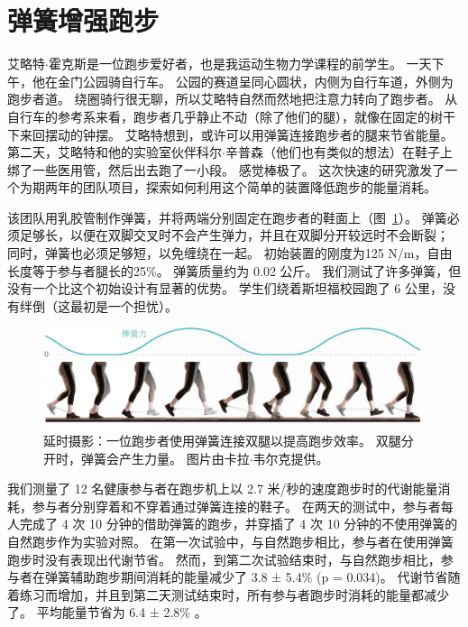\section{弹簧增强跑步}

艾略特$\cdot$霍克斯是一位跑步爱好者，也是我运动生物力学课程的前学生。
一天下午，他在金门公园骑自行车。
公园的赛道呈同心圆状，内侧为自行车道，外侧为跑步者道。
绕圈骑行很无聊，所以艾略特自然而然地把注意力转向了跑步者。
从自行车的参考系来看，跑步者几乎静止不动（除了他们的腿），就像在固定的树干下来回摆动的钟摆。
艾略特想到，或许可以用弹簧连接跑步者的腿来节省能量。
第二天，艾略特和他的实验室伙伴科尔$\cdot$辛普森（他们也有类似的想法）在鞋子上绑了一些医用管，然后出去跑了一小段。
感觉棒极了。
这次快速的研究激发了一个为期两年的团队项目，探索如何利用这个简单的装置降低跑步的能量消耗。


该团队用乳胶管制作弹簧，并将两端分别固定在跑步者的鞋面上（图~\ref{fig:12_15}）。
弹簧必须足够长，以便在双脚交叉时不会产生弹力，并且在双脚分开较远时不会断裂；
同时，弹簧也必须足够短，以免缠绕在一起。
初始装置的刚度为125 N/m，自由长度等于参与者腿长的25\%。
弹簧质量约为 0.02 公斤。
我们测试了许多弹簧，但没有一个比这个初始设计有显著的优势。
学生们绕着斯坦福校园跑了 6 公里，没有绊倒（这最初是一个担忧）。


\begin{figure}[!htb]
	\centering
	\includegraphics[width=1.0\linewidth]{chap12/12_15}
	\caption{延时摄影：一位跑步者使用弹簧连接双腿以提高跑步效率。
		双腿分开时，弹簧会产生力量。
		图片由卡拉$\cdot$韦尔克提供。 \label{fig:12_15}}
\end{figure}


我们测量了 12 名健康参与者在跑步机上以 2.7 米/秒的速度跑步时的代谢能量消耗，参与者分别穿着和不穿着通过弹簧连接的鞋子。
在两天的测试中，参与者每人完成了 4 次 10 分钟的借助弹簧的跑步，并穿插了 4 次 10 分钟的不使用弹簧的自然跑步作为实验对照。
在第一次试验中，与自然跑步相比，参与者在使用弹簧跑步时没有表现出代谢节省。
然而，到第二次试验结束时，与自然跑步相比，参与者在弹簧辅助跑步期间消耗的能量减少了 3.8 ± 5.4\% (p = 0.034)。
代谢节省随着练习而增加，并且到第二天测试结束时，所有参与者跑步时消耗的能量都减少了。
平均能量节省为 6.4 ± 2.8\% \cite{simpson2019connecting}。


